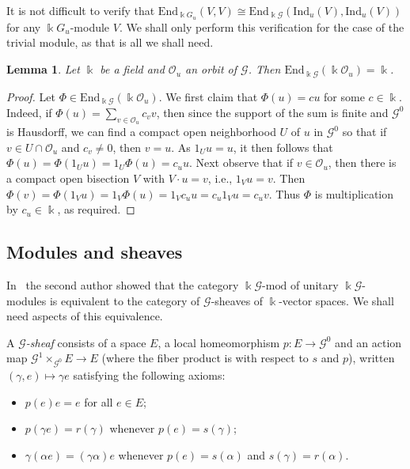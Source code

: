 \documentclass[11pt,reqno]{amsart}
\theoremstyle{plain}
\newtheorem{lem}[thm]{Lemma}
\numberwithin{equation}{section}
\newcommand{\orb}[0]{\mathcal{O}}
\begin{document}
 It is not difficult to verify that $\mathrm{End}_{\Bbbk G_u}(V,V)\cong \mathrm{End}_{\Bbbk \mathscr G}(\mathrm{Ind}_u(V),\mathrm{Ind}_u(V))$ for any $\Bbbk G_u$-module $V$.  We shall only perform this verification for the case of the trivial module, as that is all we shall need.

\begin{lem}\label{l:endo.trivial}
Let $\Bbbk$ be a field and $\orb_u$ an orbit of $\mathscr G$.  Then $\mathrm{End}_{\Bbbk \mathscr G}(\Bbbk \orb_u)=\Bbbk$.
\end{lem}
\begin{proof}
Let $\Phi\in \mathrm{End}_{\Bbbk \mathscr G}(\Bbbk \orb_u)$.  We first claim that $\Phi(u) = cu$ for some $c\in \Bbbk$.  Indeed, if $\Phi(u) = \sum_{v\in \orb_u}c_vv$, then since the support of the sum is finite and $\mathscr G^0$ is Hausdorff, we can find a compact open neighborhood $U$ of $u$ in $\mathscr G^0$ so that if $v\in U\cap \orb_u$ and $c_v\neq 0$, then $v=u$.  As $1_Uu=u$, it then follows that $\Phi(u) = \Phi(1_Uu)=1_U\Phi(u) = c_uu$.    Next observe that if $v\in \orb_u$, then there is a compact open bisection $V$ with $V\cdot u=v$, i.e., $1_Vu=v$.  Then $\Phi(v) = \Phi(1_Vu)=1_V\Phi(u) = 1_Vc_uu = c_u1_Vu=c_uv$.    Thus $\Phi$ is multiplication by $c_u\in \Bbbk$, as required.
\end{proof}

\subsection{Modules and sheaves}
 In~\cite{St14} the second author showed that the category $\Bbbk \mathscr G\text{-}\mathrm{mod}$ of unitary $\Bbbk\mathscr G$-modules is equivalent to the category of $\mathscr G$-sheaves of $\Bbbk$-vector spaces.  We shall need aspects of this equivalence.

A \emph{$\mathscr G$-sheaf} consists of a space $E$, a local homeomorphism $p\colon E\to \mathscr G^0$ and an action map $\mathscr G^1\times_{\mathscr G^0} E\to E$ (where the fiber product is with respect to $s$ and $p$), written $(\gamma,e)\mapsto \gamma e$ satisfying the following axioms:
\begin{itemize}
\item $p(e)e=e$ for all $e\in E$;
\item $p(\gamma e)=r(\gamma)$ whenever $p(e)=s(\gamma)$;
\item $\gamma(\alpha e)=(\gamma \alpha)e$ whenever $p(e)=s(\alpha)$ and $s(\gamma)=r(\alpha)$.
\end{itemize}
\end{document}
